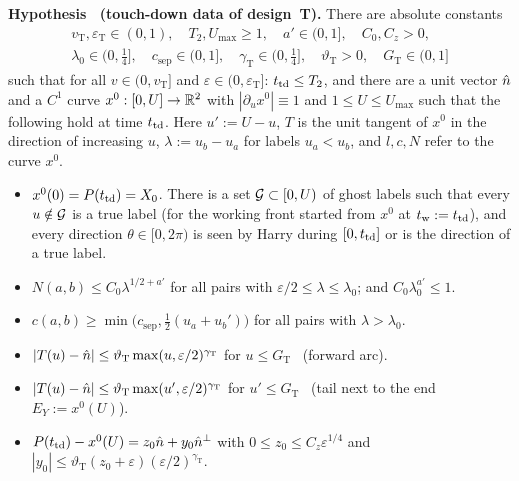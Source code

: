 \medskip\noindent
{\makeatletter\def\@currentlabel{(H$_{\mathrm T}$)}\makeatother{}\label{hyp:HT}}%
\textbf{Hypothesis \MHT\ (touch-down data of design~T).} There are absolute constants
\begin{gather*}
v_{\mathrm T},\varepsilon_{\mathrm T}\in(0,1),\quad T_2,U_{\max}\ge1,\quad a'\in(0,1],\quad C_0,C_z>0,\\
\lambda_0\in(0,\tfrac14],\quad c_{\mathrm{sep}}\in(0,1],\quad\gamma_{\mathrm T}\in(0,\tfrac14],\quad\vartheta_{\mathrm T}>0,\quad
G_{\mathrm T}\in(0,1]
\end{gather*}
such that for all $v\in(0,v_{\mathrm T}]$ and $\varepsilon\in(0,\varepsilon_{\mathrm T}]$: $t_{\mathrm{td}}\le T_2$, and there are a unit vector $\hat n$ and a $C^1$
curve $x^0:[0,U]\to\mathbb{R}^2$ with $|\partial_ux^0|\equiv1$ and $1\le U\le U_{\max}$ such that the following hold at time $t_{\mathrm{td}}$. Here
$u':=U-u$, $T$ is the unit tangent of $x^0$ in the direction of increasing $u$, $\lambda:=u_b-u_a$ for labels $u_a<u_b$, and
$l,c,N$ refer to the curve $x^0$.
\begin{itemize}
\item[(T0)] $x^0(0)=P(t_{\mathrm{td}})=X_0$. There is a set $\mathcal G\subset[0,U)$ of ghost labels such that every $u\notin\mathcal G$ is a true label
(for the working front started from $x^0$ at $t_{\mathrm w}:=t_{\mathrm{td}}$), and every direction $\theta\in[0,2\pi)$ is seen by Harry during
$[0,t_{\mathrm{td}}]$ or is the direction of a true label.
\item[(T1)] $N(a,b)\le C_0\lambda^{1/2+a'}$ for all pairs with $\varepsilon/2\le\lambda\le\lambda_0$; and
$C_0\lambda_0^{a'}\le1$.
\item[(T2)] $c(a,b)\ge\min\bigl(c_{\mathrm{sep}},\tfrac12(u_a+u_b')\bigr)$ for all pairs with $\lambda>\lambda_0$.
\item[(T3)] $|T(u)-\hat n|\le\vartheta_{\mathrm T}\max(u,\varepsilon/2)^{\gamma_{\mathrm T}}$ for $u\le G_{\mathrm T}$ \ (forward arc).
\item[(T4)] $|T(u)-\hat n|\le\vartheta_{\mathrm T}\max(u',\varepsilon/2)^{\gamma_{\mathrm T}}$ for $u'\le G_{\mathrm T}$ \ (tail next to the end
$E_Y:=x^0(U)$).
\item[(T5)] $P(t_{\mathrm{td}})-x^0(U)=z_0\hat n+y_0\hat n^\perp$ with $0\le z_0\le C_z\varepsilon^{1/4}$ and
$|y_0|\le\vartheta_{\mathrm T}(z_0+\varepsilon)(\varepsilon/2)^{\gamma_{\mathrm T}}$.
\end{itemize}

